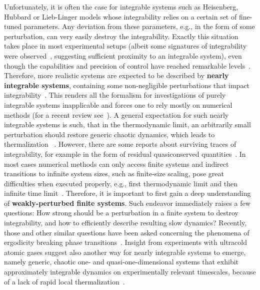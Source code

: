 Unfortunately, it is often the case for integrable systems such as Heisenberg, Hubbard or Lieb-Linger
models whose integrability relies on a certain set of fine-tuned parameters. Any deviation from these parameters, e.g.,
in the form of some perturbation, can very easily destroy the integrability. Exactly this situation takes place in most
experimental setups (albeit some signatures of integrability were observed~\autocite{Khemani2019}, suggesting sufficient
proximity to an integrable system),  even though the capabilities and precision of control have
reached remarkable levels~\autocite{Browaeys2020}. Therefore, more realistic systems
are expected to be described by \textbf{nearly integrable systems}, containing some non-negligible perturbations that
impact integrability~\autocite{Zotos2004, Brandino2015}.
This renders all the formalism for investigations of purely
integrable systems inapplicable and forces one to rely mostly on numerical methods (for a recent review
see~\textcite{Bertini2021}).
A general expectation for such nearly integrable systems is such, that in the thermodynamic limit, an
arbitrarily small perturbation should restore generic chaotic dynamics, which leads to thermalization
~\autocite{LeBlond2021}. However, there
are some reports about surviving traces of integrability, for example in the form of residual quasiconserved
quantities~\autocite{Brandino2015}. In most cases numerical methods can only access finite
systems and indirect transitions to infinite system sizes, such as finite-size scaling, pose great difficulties
when executed properly, e.g., first thermodynamic limit and then infinite time limit~\autocite{Sirker2014, CamposVenuti2010}.
Therefore, it is important to first gain a deep understanding of \textbf{weakly-perturbed finite systems}. Such
endeavor immediately raises a few questions: How strong should be a perturbation in a finite system
to destroy integrability, and how to efficiently describe resulting slow dynamics?
Recently, those and other similar questions have been asked concerning the phenomena of ergodicity breaking
phase transitions~\autocite{Suntajs2020,Suntajs2022}.
Insight from experiments with ultracold atomic gases suggest also another way for nearly integrable systems to emerge,
namely generic, chaotic one- and quasi-one-dimensional systems that exhibit approximately integrable dynamics on experimentally relevant timescales,
because of a lack of rapid local thermalization~\autocite{Polkovnikov2011, Gopalakrishnan2023}.

